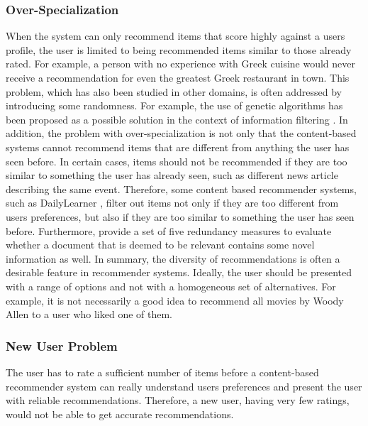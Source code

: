 \subsubsection{Over-Specialization}
When the system can only recommend items that score highly against a users profile, the user is limited to being recommended items similar to those already rated. For example, a person with no experience with Greek cuisine would never receive a recommendation for even the greatest Greek restaurant in town. This problem, which has also been studied in other domains, is often addressed by introducing some randomness. For example, the use of genetic algorithms has been proposed as a possible solution in the context of information filtering \citep{recom_98}. In addition, the problem with over-specialization is not only that the content-based systems cannot recommend items that are different from anything the user has seen before. In certain cases, items should not be recommended if they are too similar to something the user has already seen, such as different news article describing the same event. Therefore, some content based recommender systems, such as DailyLearner \citep{recom_13}, filter out items not only if they are too different from users preferences, but also if they are too similar to something the user has seen before. Furthermore, \citep{recom_112} provide a set of five redundancy measures to evaluate whether a document that is deemed to be relevant contains some novel information as well. In summary, the diversity of recommendations is often a desirable feature in recommender systems. Ideally, the user should be presented with a range of options and not with a homogeneous set of alternatives. For example, it is not necessarily a good idea to recommend all movies by Woody Allen to a user who liked one of them.

\subsubsection{New User Problem}
The user has to rate a sufficient number of items before a content-based recommender system can really understand users preferences and present the user with reliable recommendations. Therefore, a new user, having very few ratings, would not be able to get accurate recommendations.

